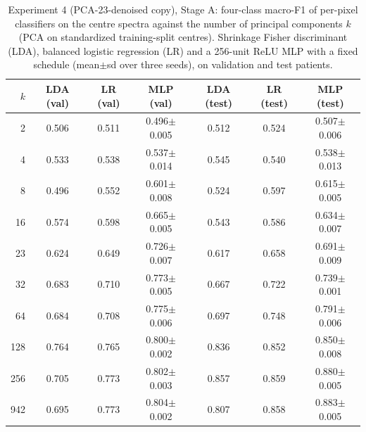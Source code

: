 \begin{table}[htbp]\centering\scriptsize
\caption{Experiment 4 (PCA-23-denoised copy), Stage A: four-class macro-F1 of per-pixel classifiers on the centre spectra against the number of principal components $k$ (PCA on standardized training-split centres). Shrinkage Fisher discriminant (LDA), balanced logistic regression (LR) and a 256-unit ReLU MLP with a fixed schedule (mean$\pm$sd over three seeds), on validation and test patients.}\label{tab:exp4_pixel_pca23}
\begin{tabular}{rcccccc}\toprule
$k$ & LDA (val) & LR (val) & MLP (val) & LDA (test) & LR (test) & MLP (test) \\ \midrule
2 & 0.506 & 0.511 & 0.496$\pm$0.005 & 0.512 & 0.524 & 0.507$\pm$0.006 \\
4 & 0.533 & 0.538 & 0.537$\pm$0.014 & 0.545 & 0.540 & 0.538$\pm$0.013 \\
8 & 0.496 & 0.552 & 0.601$\pm$0.008 & 0.524 & 0.597 & 0.615$\pm$0.005 \\
16 & 0.574 & 0.598 & 0.665$\pm$0.005 & 0.543 & 0.586 & 0.634$\pm$0.007 \\
23 & 0.624 & 0.649 & 0.726$\pm$0.007 & 0.617 & 0.658 & 0.691$\pm$0.009 \\
32 & 0.683 & 0.710 & 0.773$\pm$0.005 & 0.667 & 0.722 & 0.739$\pm$0.001 \\
64 & 0.684 & 0.708 & 0.775$\pm$0.006 & 0.697 & 0.748 & 0.791$\pm$0.006 \\
128 & 0.764 & 0.765 & 0.800$\pm$0.002 & 0.836 & 0.852 & 0.850$\pm$0.008 \\
256 & 0.705 & 0.773 & 0.802$\pm$0.003 & 0.857 & 0.859 & 0.880$\pm$0.005 \\
942 & 0.695 & 0.773 & 0.804$\pm$0.002 & 0.807 & 0.858 & 0.883$\pm$0.005 \\
\bottomrule\end{tabular}\end{table}
